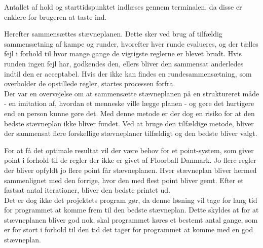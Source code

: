 Antallet af hold og starttidspunktet indlæses gennem terminalen, da disse er enklere for brugeren at taste ind.
\par
Herefter sammensættes stævneplanen. Dette sker ved brug af tilfældig sammensætning af kampe og runder, hvorefter hver runde evalueres, og der tælles fejl i forhold til hvor mange gange de vigtigste reglerne er blevet brudt. Hvis runden ingen fejl har, godkendes den, ellers bliver den sammensat anderledes indtil den er acceptabel. Hvis der ikke kan findes en rundesammensætning, som overholder de opstillede regler, startes processen forfra.\\
Der var en overvejelse om at sammensætte stævneplanen på en struktureret måde - en imitation af, hvordan et menneske ville lægge planen - og gøre det hurtigere end en person kunne gøre det. Med denne metode er der dog en risiko for at den bedste stævneplan ikke bliver fundet. Ved at bruge den tilfældige metode, bliver der sammensat flere forskellige stævneplaner tilfældigt og den bedste bliver valgt.\par
For at få det optimale resultat vil der være behov for et point-system, som giver point i forhold til de regler der ikke er givet af Floorball Danmark. Jo flere regler der bliver opfyldt jo flere point får stævneplanen. Hver stævneplan bliver hermed sammenlignet med den forrige, hvor den med flest point bliver gemt. Efter et fastsat antal iterationer, bliver den bedste printet ud.\\
Det er dog ikke det projektets program gør, da denne løsning vil tage for lang tid for programmet at komme frem til den bedste stævneplan. Dette skyldes at for at stævneplanen bliver god nok, skal programmet køres et bestemt antal gange, som er for stort i forhold til den tid det tager for programmet at komme med en god stævneplan.

